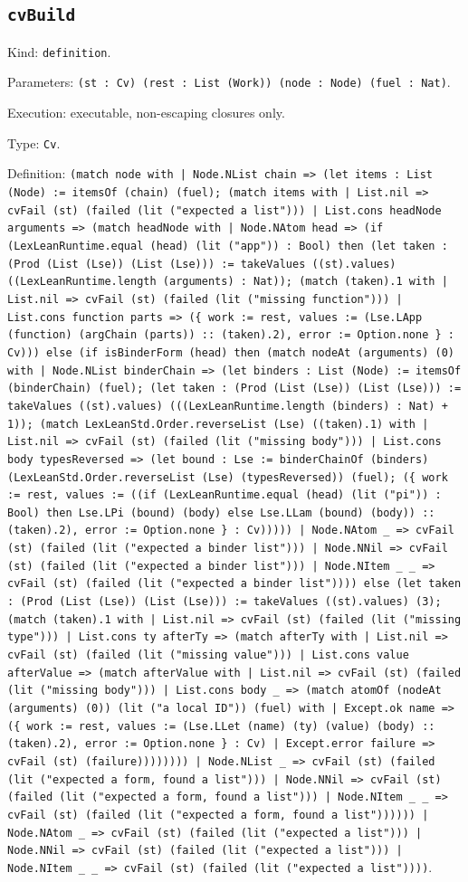 \documentclass[11pt]{article}
\begin{document}
\subsection*{\texttt{cvBuild}}
\noindent Kind: \texttt{definition}.\par
\noindent Parameters: \texttt{(st : Cv) (rest : List (Work)) (node : Node) (fuel : Nat)}.\par
\noindent Execution: executable, non-escaping closures only.\par
\noindent Type: \texttt{Cv}.\par
\noindent Definition: \texttt{(match node with | Node.NList chain => (let items : List (Node) := itemsOf (chain) (fuel); (match items with | List.nil => cvFail (st) (failed (lit ("expected a list"))) | List.cons headNode arguments => (match headNode with | Node.NAtom head => (if (LexLeanRuntime.equal (head) (lit ("app")) : Bool) then (let taken : (Prod (List (Lse)) (List (Lse))) := takeValues ((st).values) ((LexLeanRuntime.length (arguments) : Nat)); (match (taken).1 with | List.nil => cvFail (st) (failed (lit ("missing function"))) | List.cons function parts => (\{ work := rest, values := (Lse.LApp (function) (argChain (parts)) :: (taken).2), error := Option.none \} : Cv))) else (if isBinderForm (head) then (match nodeAt (arguments) (0) with | Node.NList binderChain => (let binders : List (Node) := itemsOf (binderChain) (fuel); (let taken : (Prod (List (Lse)) (List (Lse))) := takeValues ((st).values) (((LexLeanRuntime.length (binders) : Nat) + 1)); (match LexLeanStd.Order.reverseList (Lse) ((taken).1) with | List.nil => cvFail (st) (failed (lit ("missing body"))) | List.cons body typesReversed => (let bound : Lse := binderChainOf (binders) (LexLeanStd.Order.reverseList (Lse) (typesReversed)) (fuel); (\{ work := rest, values := ((if (LexLeanRuntime.equal (head) (lit ("pi")) : Bool) then Lse.LPi (bound) (body) else Lse.LLam (bound) (body)) :: (taken).2), error := Option.none \} : Cv))))) | Node.NAtom \_ => cvFail (st) (failed (lit ("expected a binder list"))) | Node.NNil => cvFail (st) (failed (lit ("expected a binder list"))) | Node.NItem \_ \_ => cvFail (st) (failed (lit ("expected a binder list")))) else (let taken : (Prod (List (Lse)) (List (Lse))) := takeValues ((st).values) (3); (match (taken).1 with | List.nil => cvFail (st) (failed (lit ("missing type"))) | List.cons ty afterTy => (match afterTy with | List.nil => cvFail (st) (failed (lit ("missing value"))) | List.cons value afterValue => (match afterValue with | List.nil => cvFail (st) (failed (lit ("missing body"))) | List.cons body \_ => (match atomOf (nodeAt (arguments) (0)) (lit ("a local ID")) (fuel) with | Except.ok name => (\{ work := rest, values := (Lse.LLet (name) (ty) (value) (body) :: (taken).2), error := Option.none \} : Cv) | Except.error failure => cvFail (st) (failure)))))))) | Node.NList \_ => cvFail (st) (failed (lit ("expected a form, found a list"))) | Node.NNil => cvFail (st) (failed (lit ("expected a form, found a list"))) | Node.NItem \_ \_ => cvFail (st) (failed (lit ("expected a form, found a list")))))) | Node.NAtom \_ => cvFail (st) (failed (lit ("expected a list"))) | Node.NNil => cvFail (st) (failed (lit ("expected a list"))) | Node.NItem \_ \_ => cvFail (st) (failed (lit ("expected a list"))))}.\par
\end{document}
